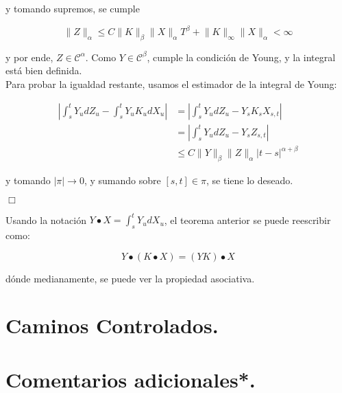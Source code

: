 y tomando supremos, se cumple

\[
	\lVert Z \rVert_{\alpha} \leq C \lVert K \rVert_{\beta} \lVert X \rVert_{\alpha} T^{\beta} + \lVert K \rVert_{\infty} \lVert X \rVert_{\alpha} < \infty
\]

y por ende, $Z \in \mathcal{C}^{\alpha}$. Como $Y \in \mathcal{C}^{\beta}$, cumple la condición de Young, y la integral está bien definida. \\

Para probar la igualdad restante, usamos el estimador de la integral de Young:

\begin{align*}
	\left\lvert \int_s^t Y_u dZ_u - \int_s^t Y_u K_u dX_u \right\rvert &= \left\lvert \int_s^t Y_u dZ_u - Y_s K_s X_{s,t} \right\rvert \\
	&=  \left \lvert \int_s^t Y_u dZ_u - Y_s Z_{s,t} \right \rvert\\
	&\leq C \lVert Y \rVert_{\beta} \lVert Z \rVert_{\alpha} \lvert t - s \rvert^{\alpha + \beta}
\end{align*}

y tomando $\lvert \pi \rvert \rightarrow 0$, y sumando sobre $[s,t] \in \pi$, se tiene lo deseado. 

\begin{flushright}
	$\Box$
\end{flushright}

Usando la notación $Y \bullet X = \int_s^t Y_u dX_u$, el teorema anterior se puede reescribir como:

\[
	Y \bullet (K \bullet X) = (Y K) \bullet X
\] 

dónde medianamente, se puede ver la propiedad asociativa.








\section{Caminos Controlados.}






\section{Comentarios adicionales*.}

